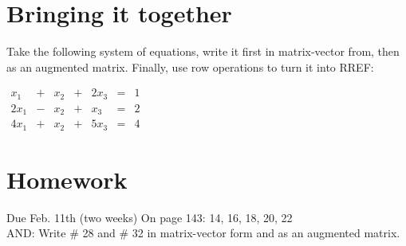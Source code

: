 \documentclass{article}
\begin{document}
\begin{flushleft}
\section{Bringing it together}
Take the following system of equations, write it first in matrix-vector from, then as an augmented matrix. Finally, use row operations to turn it into RREF:\\
\begin{center}
$\begin{array}{rrrrrrr}
x_1 & + & x_2 & + & 2 x_3 & = & 1\\
2 x_1 & - & x_2 & + & x_3 & = & 2\\
4 x_1 & + & x_2 & + & 5 x_3 & = & 4
\end{array}
$
\end{center}
\vspace{5in}
\section{Homework}
\LARGE Due Feb. 11th (two weeks)
\normalsize
On page 143: 14, 16, 18, 20, 22\\
AND: Write \# 28 and \# 32 in matrix-vector form and as an augmented matrix.

\end{flushleft}
\end{document}
